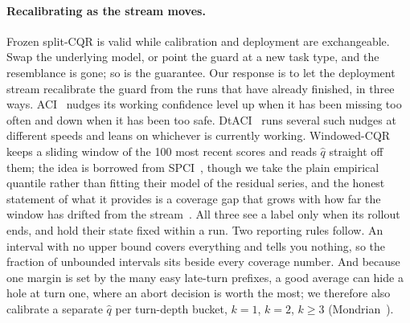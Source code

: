 \paragraph{Recalibrating as the stream moves.}
Frozen split-CQR is valid while calibration and deployment are exchangeable. Swap the underlying model, or point the guard at a new task type, and the resemblance is gone; so is the guarantee. Our response is to let the deployment stream recalibrate the guard from the runs that have already finished, in three ways. ACI~\cite{gibbs2021aci} nudges its working confidence level up when it has been missing too often and down when it has been too safe. DtACI~\cite{gibbs2024dtaci} runs several such nudges at different speeds and leans on whichever is currently working. Windowed-CQR keeps a sliding window of the 100 most recent scores and reads $\hat q$ straight off them; the idea is borrowed from SPCI~\cite{xu2023spci}, though we take the plain empirical quantile rather than fitting their model of the residual series, and the honest statement of what it provides is a coverage gap that grows with how far the window has drifted from the stream~\cite{barber2023beyond}. All three see a label only when its rollout ends, and hold their state fixed within a run. Two reporting rules follow. An interval with no upper bound covers everything and tells you nothing, so the fraction of unbounded intervals sits beside every coverage number. And because one margin is set by the many easy late-turn prefixes, a good average can hide a hole at turn one, where an abort decision is worth the most; we therefore also calibrate a separate $\hat q$ per turn-depth bucket, $k{=}1$, $k{=}2$, $k{\ge}3$ (Mondrian~\cite{vovk2012conditional}).

